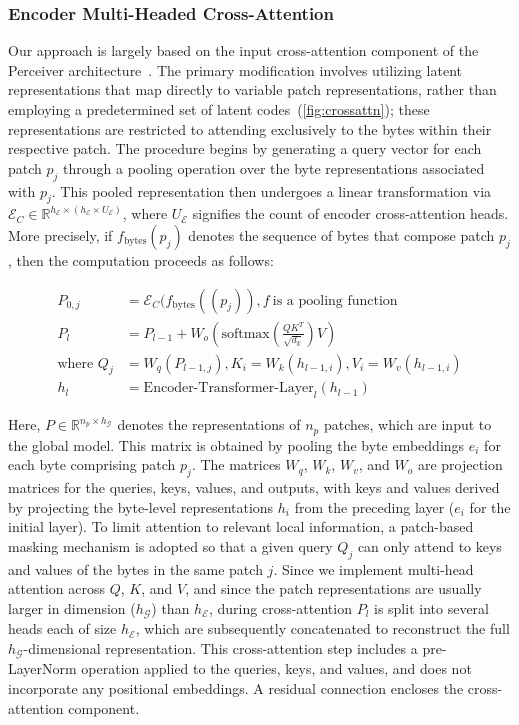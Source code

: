 \subsubsection{Encoder Multi-Headed Cross-Attention}
\label{sec:enc-cross-attn}
Our approach is largely based on the input cross-attention component of the Perceiver architecture~\citep{jaegle2021perceiver}. The primary modification involves utilizing latent representations that map directly to variable patch representations, rather than employing a predetermined set of latent codes~(\autoref{fig:crossattn}); these representations are restricted to attending exclusively to the bytes within their respective patch. The procedure begins by generating a query vector for each patch $p_j$ through a pooling operation over the byte representations associated with $p_j$. This pooled representation then undergoes a linear transformation via $\mathcal{E}_{C} \in \mathbb{R}^{h_{\mathcal{E}} \times (h_{\mathcal{E}} \times U_{\mathcal{E}})}$, where $U_{\mathcal{E}}$ signifies the count of encoder cross-attention heads. More precisely, if $f_{\text{bytes}}(p_j)$ denotes the sequence of bytes that compose patch $p_j$, then the computation proceeds as follows:

\begin{align}
P_{0,j} &= \mathcal{E}_{C}(f_\text{bytes}((p_j)), f~ \text{is a pooling function} \\
P_l &= P_{l-1} + W_o\left(\text{softmax}\left(\frac{QK^T}{\sqrt{d_k}}\right)V\right) \\
\text{where } Q_j &= W_q(P_{l-1,j}), K_i = W_k(h_{l-1,i}), V_i = W_v(h_{l-1,i}) \\
h_l &= \text{Encoder-Transformer-Layer}_l(h_{l-1})
\end{align}

Here, $P \in \mathbb{R}^{n_p \times h_{\mathcal{G}}}$ denotes the representations of $n_p$ patches, which are input to the global model. This matrix is obtained by pooling the byte embeddings $e_i$ for each byte comprising patch $p_j$. The matrices $W_q$, $W_k$, $W_v$, and $W_o$ are projection matrices for the queries, keys, values, and outputs, with keys and values derived by projecting the byte-level representations $h_i$ from the preceding layer ($e_i$ for the initial layer). To limit attention to relevant local information, a patch-based masking mechanism is adopted so that a given query $Q_j$ can only attend to keys and values of the bytes in the same patch $j$. Since we implement multi-head attention across $Q$, $K$, and $V$, and since the patch representations are usually larger in dimension ($h_{\mathcal{G}}$) than $h_{\mathcal{E}}$, during cross-attention $P_l$ is split into several heads each of size $h_{\mathcal{E}}$, which are subsequently concatenated to reconstruct the full $h_{\mathcal{G}}$-dimensional representation. This cross-attention step includes a pre-LayerNorm operation applied to the queries, keys, and values, and does not incorporate any positional embeddings. A residual connection encloses the cross-attention component.


